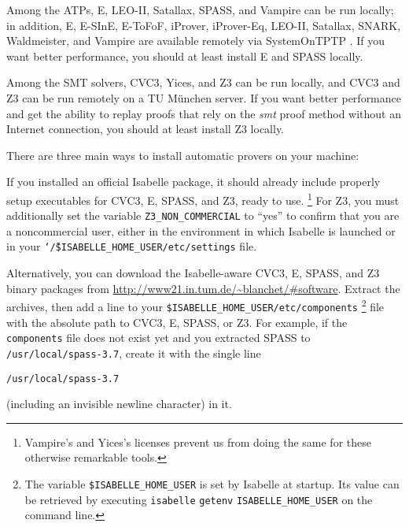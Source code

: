 \documentclass[a4paper,12pt]{article}
\newcommand\download{\url{http://www21.in.tum.de/~blanchet/\#software}}
\begin{document}
Among the ATPs, E, LEO-II, Satallax, SPASS, and Vampire can be run locally; in
addition, E, E-SInE, E-ToFoF, iProver, iProver-Eq, LEO-II, Satallax, SNARK,
Waldmeister, and Vampire are available remotely via System\-On\-TPTP
\cite{sutcliffe-2000}. If you want better performance, you should at least
install E and SPASS locally.

Among the SMT solvers, CVC3, Yices, and Z3 can be run locally, and CVC3 and Z3
can be run remotely on a TU M\"unchen server. If you want better performance and
get the ability to replay proofs that rely on the \emph{smt} proof method
without an Internet connection, you should at least install Z3 locally.

There are three main ways to install automatic provers on your machine:

\begin{sloppy}
\begin{enum}
\item[\labelitemi] If you installed an official Isabelle package, it should
already include properly setup executables for CVC3, E, SPASS, and Z3, ready to use.%
\footnote{Vampire's and Yices's licenses prevent us from doing the same for
these otherwise remarkable tools.}
For Z3, you must additionally set the variable
\texttt{Z3\_NON\_COMMERCIAL} to ``yes'' to confirm that you are a
noncommercial user, either in the environment in which Isabelle is
launched or in your
\texttt{\char`\~/\$ISABELLE\_HOME\_USER/etc/settings} file.

\item[\labelitemi] Alternatively, you can download the Isabelle-aware CVC3, E,
SPASS, and Z3 binary packages from \download. Extract the archives, then add a
line to your \texttt{\$ISABELLE\_HOME\_USER\slash etc\slash components}%
\footnote{The variable \texttt{\$ISABELLE\_HOME\_USER} is set by Isabelle at
startup. Its value can be retrieved by executing \texttt{isabelle}
\texttt{getenv} \texttt{ISABELLE\_HOME\_USER} on the command line.}
file with the absolute path to CVC3, E, SPASS, or Z3. For example, if the
\texttt{components} file does not exist yet and you extracted SPASS to
\texttt{/usr/local/spass-3.7}, create it with the single line

\prew
\texttt{/usr/local/spass-3.7}
\postw

(including an invisible newline character) in it.


\end{enum}
\end{sloppy}
\end{document}
